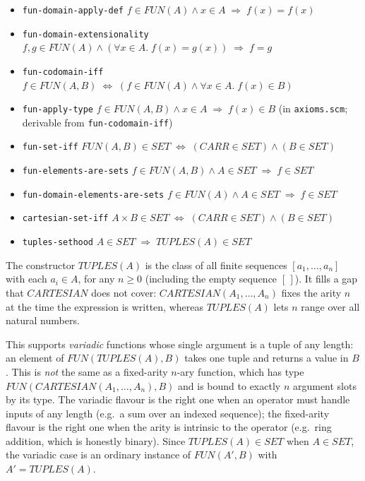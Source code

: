 \begin{itemize}
\item \texttt{fun-domain-apply-def}
  $f \in \mathit{FUN}(A) \land x \in A \;\Rightarrow\; f(x) = f(x)$
\item \texttt{fun-domain-extensionality}
  $f,g \in \mathit{FUN}(A) \land (\forall x \in A.\;f(x) = g(x)) \;\Rightarrow\; f = g$
\item \texttt{fun-codomain-iff}
  $f \in \mathit{FUN}(A,B) \;\Leftrightarrow\;
   (f \in \mathit{FUN}(A) \land \forall x \in A.\;f(x) \in B)$
\item \texttt{fun-apply-type}
  $f \in \mathit{FUN}(A,B) \land x \in A \;\Rightarrow\; f(x) \in B$
  (in \texttt{axioms.scm}; derivable from \texttt{fun-codomain-iff})
\item \texttt{fun-set-iff}
  $\mathit{FUN}(A,B) \in \mathit{SET} \;\Leftrightarrow\; (CARR \in \mathit{SET}) \land (B \in \mathit{SET})$
\item \texttt{fun-elements-are-sets}
  $f \in \mathit{FUN}(A,B) \land A \in \mathit{SET} \;\Rightarrow\; f \in \mathit{SET}$
\item \texttt{fun-domain-elements-are-sets}
  $f \in \mathit{FUN}(A) \land A \in \mathit{SET} \;\Rightarrow\; f \in \mathit{SET}$
\item \texttt{cartesian-set-iff}
  $A \times B \in \mathit{SET} \;\Leftrightarrow\; (CARR \in \mathit{SET}) \land (B \in \mathit{SET})$
\item \texttt{tuples-sethood}
  $A \in \mathit{SET} \;\Rightarrow\; \mathit{TUPLES}(A) \in \mathit{SET}$
\end{itemize}

\begin{remark}
The constructor $\mathit{TUPLES}(A)$ is the class of all finite sequences
$[a_1, \ldots, a_n]$ with each $a_i \in A$, for any $n \ge 0$ (including
the empty sequence $[\,]$).  It fills a gap that $\mathit{CARTESIAN}$ does
not cover: $\mathit{CARTESIAN}(A_1, \ldots, A_n)$ fixes the arity $n$ at
the time the expression is written, whereas $\mathit{TUPLES}(A)$ lets $n$
range over all natural numbers.

This supports \emph{variadic} functions whose single argument is a tuple
of any length: an element of $\mathit{FUN}(\mathit{TUPLES}(A), B)$ takes
one tuple and returns a value in $B$.  This is \emph{not} the same as a
fixed-arity $n$-ary function, which has type
$\mathit{FUN}(\mathit{CARTESIAN}(A_1, \ldots, A_n), B)$ and is bound to
exactly $n$ argument slots by its type.  The variadic flavour is the
right one when an operator must handle inputs of any length (e.g.\ a sum
over an indexed sequence); the fixed-arity flavour is the right one when
the arity is intrinsic to the operator (e.g.\ ring addition, which is
honestly binary).  Since $\mathit{TUPLES}(A) \in \mathit{SET}$ when
$A \in \mathit{SET}$, the variadic case is an ordinary instance of
$\mathit{FUN}(A', B)$ with $A' = \mathit{TUPLES}(A)$.
\end{remark}

